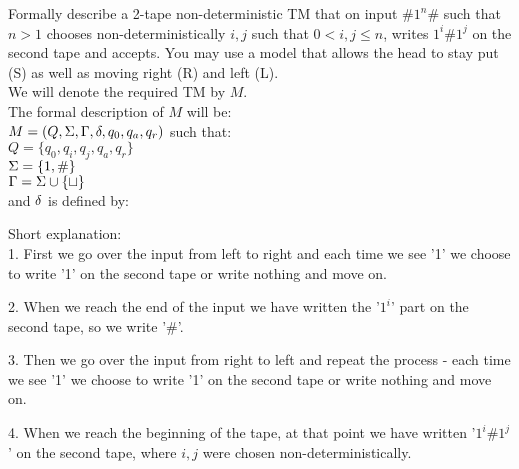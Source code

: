 Formally describe a 2-tape non-deterministic TM that on input $\#1^n\#$ such
that $n > 1$ chooses non-deterministically $i, j$ such that $0 < i, j \leq n$, writes
$1^i\#1^j$ on the second tape and accepts. You may use a model that allows the
head to stay put (S) as well as moving right (R) and left (L). \\

We will denote the required TM by $M$. \\
The formal description of $M$ will be: \\
$ M = (Q, \Sigma, \Gamma, \delta, q_0, q_a, q_r) $ such that: \\
$ Q      = \{q_0, q_i, q_j, q_a, q_r\} $ \\
$ \Sigma    = \{1, \#\} $ \\
$ \Gamma = \Sigma \cup \{\sqcup\} $ \\
and $\delta$ is defined by:

\begin{figure}[h]
    \centering
    \label{fig:multiple5}
\end{figure}


Short explanation: \\
1. First we go over the input from left to right and each time we see '1' we choose
to write '1' on the second tape or write nothing and move on.

2. When we reach the end of the input we have written the '$1^i$' part on the second tape, so we write '$\#$'.

3. Then we go over the input from right to left and repeat the process - each time we
see '1' we choose to write '1' on the second tape or write nothing and move on.

4. When we reach the beginning of the tape, at that point we have written '$1^i\#1^j$' on the second tape,
where $i, j$ were chosen non-deterministically.

